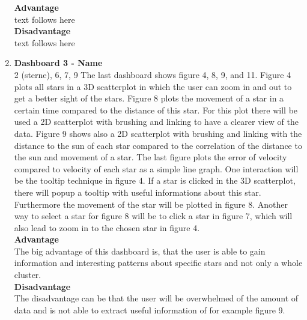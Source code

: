 \documentclass{article}
\begin{document}
\begin{enumerate}
\textbf{Advantage} \\
text follows here \\

\textbf{Disadvantage} \\
text follows here \\

\item \textbf{Dashboard 3 - Name} \\
2 (sterne), 6, 7, 9
The last dashboard shows figure 4, 8, 9, and 11. Figure 4 plots all stars in a 3D scatterplot in which the user can zoom in and out to get a better sight of the stars. Figure 8 plots the movement of a star in a certain time compared to the distance of this star. For this plot there will be used a 2D scatterplot with brushing and linking to have a clearer view of the data. Figure 9 shows also a 2D scatterplot with brushing and linking with the distance to the sun of each star compared to the correlation of the distance to the sun and movement of a star. The last figure plots the error of velocity compared to velocity of each star as a simple line graph. One interaction will be the tooltip technique in figure 4. If a star is clicked in the 3D scatterplot, there will popup a tooltip with useful informations about this star. Furthermore the movement of the star will be plotted in figure 8. Another way to select a star for figure 8 will be to click a star in figure 7, which will also lead to zoom in to the chosen star in figure 4. \\

\textbf{Advantage} \\
The big advantage of this dashboard is, that the user is able to gain information and interesting patterns about specific stars and not only a whole cluster. \\

\textbf{Disadvantage} \\
The disadvantage can be that the user will be overwhelmed of the amount of data and is not able to extract useful information of for example figure 9.  \\

\end{enumerate}
\end{document}
